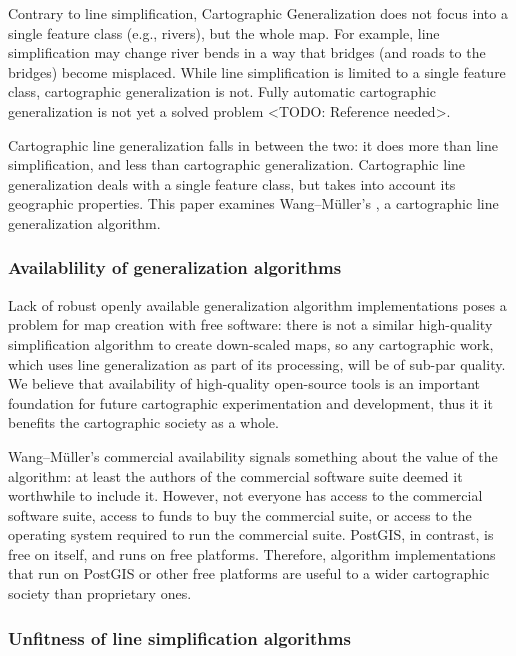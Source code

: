 \documentclass[a4paper]{article}
\newcommand{\titlecite}[1]{\citetitle{#1}\cite{#1}}
\newcommand{\WM}{Wang--M{\"u}ller}
\begin{document}
Contrary to line simplification, Cartographic Generalization does not focus
into a single feature class (e.g., rivers), but the whole map. For example,
line simplification may change river bends in a way that bridges (and roads to
the bridges) become misplaced. While line simplification is limited to a single
feature class, cartographic generalization is not. Fully automatic cartographic
generalization is not yet a solved problem <TODO: Reference needed>.

Cartographic line generalization falls in between the two: it does more than
line simplification, and less than cartographic generalization. Cartographic
line generalization deals with a single feature class, but takes into account
its geographic properties. This paper examines {\WM}'s
\titlecite{wang1998line}, a cartographic line generalization algorithm.

\subsubsection{Availablility of generalization algorithms}

Lack of robust openly available generalization algorithm implementations poses
a problem for map creation with free software: there is not a similar
high-quality simplification algorithm to create down-scaled maps, so any
cartographic work, which uses line generalization as part of its processing,
will be of sub-par quality. We believe that availability of high-quality
open-source tools is an important foundation for future cartographic
experimentation and development, thus it it benefits the cartographic society
as a whole.

{\WM}'s commercial availability signals something about the value of the
algorithm: at least the authors of the commercial software suite deemed it
worthwhile to include it. However, not everyone has access to the commercial
software suite, access to funds to buy the commercial suite, or access to the
operating system required to run the commercial suite. PostGIS, in contrast, is
free on itself, and runs on free platforms. Therefore, algorithm
implementations that run on PostGIS or other free platforms are useful to a
wider cartographic society than proprietary ones.

\subsubsection{Unfitness of line simplification algorithms}
\end{document}
